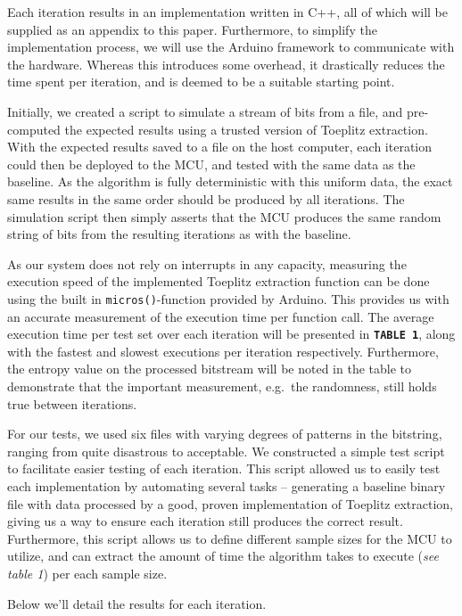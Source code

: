 Each iteration results in an implementation written in C++, all of which will be supplied as an appendix to this paper. Furthermore, to simplify the implementation process, we will use the Arduino framework to communicate with the hardware. Whereas this introduces some overhead, it drastically reduces the time spent per iteration, and is deemed to be a suitable starting point.

Initially, we created a script to simulate a stream of bits from a file, and pre-computed the expected results using a trusted version of Toeplitz extraction. With the expected results saved to a file on the host computer, each iteration could then be deployed to the MCU, and tested with the same data as the baseline. As the algorithm is fully deterministic with this uniform data, the exact same results in the same order should be produced by all iterations. The simulation script then simply asserts that the MCU produces the same random string of bits from the resulting iterations as with the baseline.

As our system does not rely on interrupts in any capacity, measuring the execution speed of the implemented Toeplitz extraction function can be done using the built in \texttt{micros()}-function provided by Arduino. This provides us with an accurate measurement of the execution time per function call. The average execution time per test set over each iteration will be presented in \textbf{\texttt{TABLE\ 1}}, along with the fastest and slowest executions per iteration respectively. Furthermore, the entropy value on the processed bitstream will be noted in the table to demonstrate that the important measurement, e.g.~the randomness, still holds true between iterations.

For our tests, we used six files with varying degrees of patterns in the bitstring, ranging from quite disastrous to acceptable. We constructed a simple test script to facilitate easier testing of each iteration. This script allowed us to easily test each implementation by automating several tasks -- generating a baseline binary file with data processed by a good, proven implementation of Toeplitz extraction, giving us a way to ensure each iteration still produces the correct result. Furthermore, this script allows us to define different sample sizes for the MCU to utilize, and can extract the amount of time the algorithm takes to execute (\emph{see table 1}) per each sample size.

Below we'll detail the results for each iteration.

